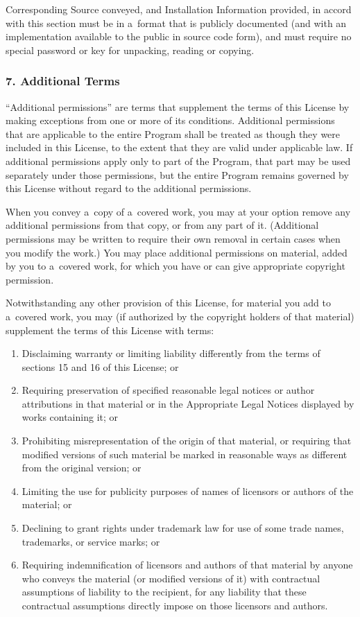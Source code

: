\documentclass[a4paper, 11pt, twoside]{article}
\begin{document}
Corresponding Source conveyed, and Installation Information provided, in accord with this section must be in a~format that is publicly documented (and with an implementation available to the public in source code form), and must require no special password or key for unpacking, reading or copying.

\subsubsection{7. Additional Terms}

“Additional permissions” are terms that supplement the terms of this License by making exceptions from one or more of its conditions. Additional permissions that are applicable to the entire Program shall be treated as though they were included in this License, to the extent that they are valid under applicable law. If additional permissions apply only to part of the Program, that part may be used separately under those permissions, but the entire Program remains governed by this License without regard to the additional permissions.

When you convey a~copy of a~covered work, you may at your option remove any additional permissions from that copy, or from any part of it. (Additional permissions may be written to require their own removal in certain cases when you modify the work.) You may place additional permissions on material, added by you to a~covered work, for which you have or can give appropriate copyright permission.

Notwithstanding any other provision of this License, for material you add to a~covered work, you may (if authorized by the copyright holders of that material) supplement the terms of this License with terms:

\begin{enumerate}[label=\Alph*)]
\item Disclaiming warranty or limiting liability differently from the terms of sections 15 and 16 of this License; or
\item Requiring preservation of specified reasonable legal notices or author attributions in that material or in the Appropriate Legal Notices displayed by works containing it; or
\item Prohibiting misrepresentation of the origin of that material, or requiring that modified versions of such material be marked in reasonable ways as different from the original version; or
\item Limiting the use for publicity purposes of names of licensors or authors of the material; or
\item Declining to grant rights under trademark law for use of some trade names, trademarks, or service marks; or 
\item Requiring indemnification of licensors and authors of that material by anyone who conveys the material (or modified versions of it) with contractual assumptions of liability to the recipient, for any liability that these contractual assumptions directly impose on those licensors and authors.
\end{enumerate}
\end{document}
